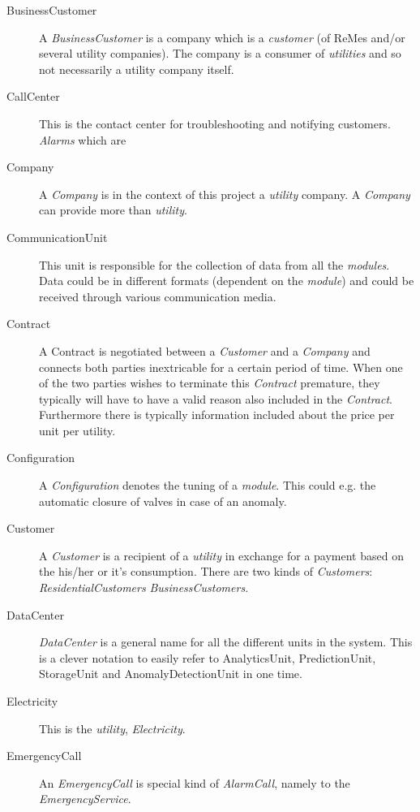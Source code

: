 \begin{description}
\item[BusinessCustomer] A \emph{BusinessCustomer} is a company which is a
\emph{customer} (of ReMes and/or several utility companies). The company is a
consumer of \emph{utilities} and so not necessarily a utility company itself.

\item[CallCenter] This is the contact center for troubleshooting and notifying
customers. \emph{Alarms} which are 

\item[Company] A \emph{Company} is in the context of this project a
\emph{utility} company. A \emph{Company} can provide more than \emph{utility}. 

\item[CommunicationUnit] This unit is responsible for the collection of data
from all the \emph{modules}. Data could be in different formats (dependent on
the \emph{module}) and could be received through various communication media.

\item[Contract] A Contract is negotiated between a \emph{Customer} and a
\emph{Company} and connects both parties inextricable for a certain period of
time. When one of the two parties wishes to terminate this \emph{Contract}
premature, they typically will have to have a valid reason also included in the
\emph{Contract}. Furthermore there is typically information included about the
price per unit per utility.

\item[Configuration] A \emph{Configuration} denotes the tuning of a
\emph{module}. This could e.g. the automatic closure of valves in case of an
anomaly.

\item[Customer] A \emph{Customer} is a recipient of a \emph{utility} in exchange
for a payment based on the his/her or it's consumption. There are two kinds of
\emph{Customers}: \emph{ResidentialCustomers} \emph{BusinessCustomers}.

\item[DataCenter] \emph{DataCenter} is a general name for all the different
units in the system. This is a clever notation to easily refer to AnalyticsUnit,
PredictionUnit, StorageUnit and AnomalyDetectionUnit in one time.

\item[Electricity] This is the \emph{utility}, \emph{Electricity}.

\item[EmergencyCall] An \emph{EmergencyCall} is special kind of
\emph{AlarmCall}, namely to the \emph{EmergencyService}.


\end{description}
